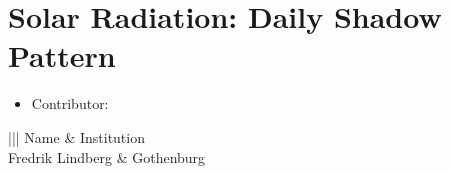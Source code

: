 \documentclass[letterpaper,10pt,english]{sphinxmanual}
\begin{document}
\section{Solar Radiation: Daily Shadow Pattern}
\label{\detokenize{processor/Solar Radiation Daily Shadow Pattern:solar-radiation-daily-shadow-pattern}}\label{\detokenize{processor/Solar Radiation Daily Shadow Pattern:dailyshadowpattern}}\label{\detokenize{processor/Solar Radiation Daily Shadow Pattern::doc}}\begin{itemize}
\item {} 
Contributor:

\end{itemize}


\begin{savenotes}\sphinxattablestart
\centering
\begin{tabular}[t]{|||}
\hline
\sphinxstyletheadfamily 
Name
&\sphinxstyletheadfamily 
Institution
\\
\hline
Fredrik Lindberg
&
Gothenburg
\\
\hline
\end{tabular}
\par
\sphinxattableend\end{savenotes}
\end{document}
